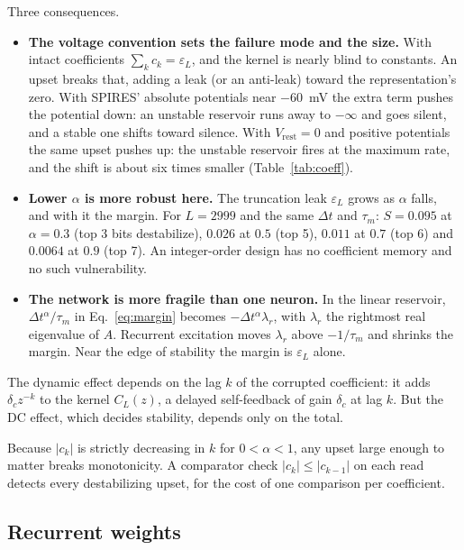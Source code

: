 \documentclass[11pt,a4paper]{article}
\newcommand{\dta}{\Delta t^{\alpha}}
\begin{document}
Three consequences.
\begin{itemize}
  \item \textbf{The voltage convention sets the failure mode and the size.} With intact coefficients $\sum_k c_k = \varepsilon_L$, and the kernel is nearly blind to constants. An upset breaks that, adding a leak (or an anti-leak) toward the representation's zero. With SPIRES' absolute potentials near $-60$~mV the extra term pushes the potential down: an unstable reservoir runs away to $-\infty$ and goes silent, and a stable one shifts toward silence. With $V_{\mathrm{rest}} = 0$ and positive potentials the same upset pushes up: the unstable reservoir fires at the maximum rate, and the shift is about six times smaller (Table~\ref{tab:coeff}).
  \item \textbf{Lower $\alpha$ is more robust here.} The truncation leak $\varepsilon_L$ grows as $\alpha$ falls, and with it the margin. For $L = 2999$ and the same $\Delta t$ and $\tau_m$: $S = 0.095$ at $\alpha = 0.3$ (top 3 bits destabilize), $0.026$ at $0.5$ (top 5), $0.011$ at $0.7$ (top 6) and $0.0064$ at $0.9$ (top 7). An integer-order design has no coefficient memory and no such vulnerability.
  \item \textbf{The network is more fragile than one neuron.} In the linear reservoir, $\dta/\tau_m$ in Eq.~\eqref{eq:margin} becomes $-\dta\lambda_r$, with $\lambda_r$ the rightmost real eigenvalue of $A$. Recurrent excitation moves $\lambda_r$ above $-1/\tau_m$ and shrinks the margin. Near the edge of stability the margin is $\varepsilon_L$ alone.
\end{itemize}
The dynamic effect depends on the lag $k$ of the corrupted coefficient: it adds $\delta_c z^{-k}$ to the kernel $C_L(z)$, a delayed self-feedback of gain $\delta_c$ at lag $k$. But the DC effect, which decides stability, depends only on the total.

Because $|c_k|$ is strictly decreasing in $k$ for $0 < \alpha < 1$, any upset large enough to matter breaks monotonicity. A comparator check $|c_k| \le |c_{k-1}|$ on each read detects every destabilizing upset, for the cost of one comparison per coefficient.

\subsection{Recurrent weights}
\label{sec:weights}
\end{document}
